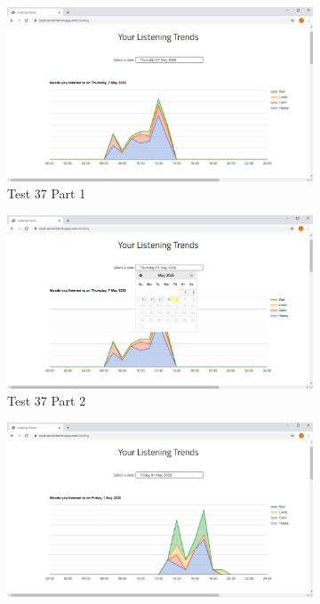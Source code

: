 \documentclass[10pt, notitlepage]{report}
\begin{document}
\begin{figure}[!h]
\centering
\begin{subfigure}{0.4\textwidth}
	\includegraphics[width=\linewidth]{test/Test37-1.png}
	\caption{Test 37 Part 1}
	\label{fig:test37-1}
\end{subfigure}
\begin{subfigure}{0.4\textwidth}
	\includegraphics[width=\linewidth]{test/Test37-2.png}
	\caption{Test 37 Part 2}
	\label{fig:test37-2}
\end{subfigure}
\begin{subfigure}{0.4\textwidth}
	\includegraphics[width=\linewidth]{test/Test37-3.png}

\end{subfigure}
\end{figure}
\end{document}
